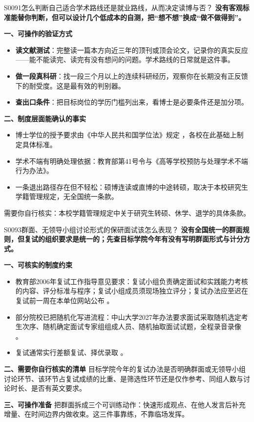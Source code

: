 \begin{qa}{S0091}{怎么判断自己适合学术路线还是就业路线，从而决定读博与否？}
\textbf{没有客观标准能替你判断，但可以设计几个低成本的自测，把“想不想”换成“做不做得到”。}

\textbf{一、可操作的验证方式}
\begin{itemize}
  \item \textbf{读文献测试}：完整读一篇本方向近三年的顶刊或顶会论文，记录你的真实反应——能不能读完、读完有没有想问的问题。学术路线的日常就是这件事。
  \item \textbf{做一段真科研}：找一段三个月以上的连续科研经历，观察你在长期没有正反馈下的耐受度。这是最有效的判别器。
  \item \textbf{查出口条件}：把目标岗位的学历门槛列出来，看博士是必要条件还是加分项。
\end{itemize}

\textbf{二、制度层面能确认的事实}
\begin{itemize}
  \item 博士学位的授予要求由《中华人民共和国学位法》规定 ，各校在此基础上制定具体标准。
  \item 学术不端有明确处理依据：教育部第41号令与《高等学校预防与处理学术不端行为办法》。
  \item 一条退出路径存在但不轻松：硕博连读或直博的中途转硕，取决于本校研究生学籍管理规定，无全国统一条款。
\end{itemize}

需要你自行核实：本校学籍管理规定中关于研究生转硕、休学、退学的具体条款。
\end{qa}

\begin{qa}{S0093}{群面、无领导小组讨论形式的保研面试该怎么表现？}
\textbf{没有全国统一的群面规则，但复试的组织要求是统一的；先查目标学院今年有没有写明群面形式与计分方式。}

\textbf{一、可核实的制度约束}
\begin{itemize}
  \item 教育部2006年复试工作指导意见要求：复试小组负责确定面试和实践能力考核的内容、评分标准与程序；复试小组成员须现场独立评分；复试办法应至迟在复试前一周在本单位网站公布 。
  \item 部分院校已把随机化写进流程：中山大学2027年办法要求面试采取随机选定考生次序、随机确定面试专家组组成人员、随机抽取面试试题，全程录音录像 。
  \item 复试通常实行差额复试、择优录取 。
\end{itemize}

\textbf{二、需要你自行核实的清单}
目标学院今年的复试办法是否明确群面或无领导小组讨论环节、该环节占复试成绩的比重、是筛选性环节还是仅作参考、同组人数与讨论时长、是否有英文要求。

\textbf{三、可操作准备}
把群面拆成三个可训练动作：快速形成观点、在他人发言后补充增量、在时间边界内做收束。这三件事靠练，不靠临场发挥。
\end{qa}

